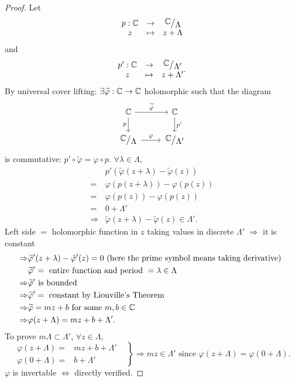 \begin{proof}
  Let 
  \[
    \begin{matrix} p:\C&\to& \sfrac{\C}{\Lambda}\\ z&\mapsto &z+\Lambda\end{matrix} 
  \]
  and 
  \[
    \begin{matrix} p':\C&\to & \sfrac{\C}{\Lambda'}\\
    z&\mapsto & z+\Lambda'\end{matrix} .
  \]
  By universal cover lifting: $\exists \widetilde{\varphi}:\mathbb{C}\to \mathbb{C}$ holomorphic such that the diagram
  \[
    \begin{tikzcd}
      \C \arrow{r}{\widetilde{\varphi}} \arrow[swap]{d}{p} & \C \arrow{d}{p'}\\
      \sfrac{\C}{\Lambda} \arrow{r}{\varphi} & \sfrac{\C}{\Lambda'}
    \end{tikzcd}
  \] 
is commutative: $p'\circ \widetilde{\varphi}=\varphi\circ p$.
$\forall \lambda \in \Lambda$, 
\begin{align*}
 & p'\left( \widetilde{\varphi}(z+\lambda)-\widetilde{\varphi}(z) \right)\\
 = & \varphi\left( p(z+\lambda) \right) -\varphi\left( p(z) \right) \\
 =& \varphi\left( p(z) \right) -\varphi\left( p(z) \right) \\
 = & 0+\Lambda'\\
 \Rightarrow & \widetilde{\varphi}\left( z+\lambda \right)-\tilde{\varphi}(z)\in \Lambda' 
.\end{align*}
Left side $=$ holomorphic function in $z$ taking values in discrete $\Lambda'$ $\Rightarrow$ it is constant
\begin{align*}
  \Rightarrow & \widetilde{\varphi}'(z+\lambda)-\tilde{\varphi}'(z)=0 \text{ (here the prime symbol means taking derivative) }\\
  & \widetilde{\varphi}' = \text{ entire function and period }=\lambda \in \Lambda\\
  \Rightarrow & \widetilde{\varphi}' \text{ is bounded}\\
  \Rightarrow & \widetilde{\varphi}'= \text{ constant by Liouville's Theorem}\\
  \Rightarrow & \widetilde{\varphi}=mz+b \text{ for some }m,b \in \mathbb{C} \\
  \Rightarrow & \varphi(z+\Lambda)=mz+b+\Lambda'
.\end{align*}
To prove $m\Lambda\subset \Lambda'$, $\forall z\in \Lambda$,
\[
  \left. \begin{matrix} \varphi(z+\Lambda)=&mz+b+\Lambda'&\\
  \varphi(0+\Lambda)=&b+\Lambda'&\end{matrix} \right\}\Rightarrow mz \in \Lambda' \text{ since }\varphi(z+\Lambda)=\varphi(0+\Lambda).
\]
$\varphi$ is invertable $\Leftrightarrow$ directly verified.
\end{proof}

